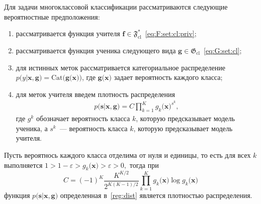 Для задачи многоклассовой классификации рассматриваются следующие вероятностные предположения:
\begin{enumerate}
\label{st:class:1}
	\item рассматривается функция учителя $\mathbf{f}\in\mathfrak{F}_{\text{cl}}^{*}$~\eqref{eq:F:set:cl:priv};
	\item рассматривается функция ученика следующего вида $\mathbf{g}\in\mathfrak{G}_{\text{cl}}$~\eqref{eq:G:set:cl};
	\item для истинных меток рассматривается категориальное распределение $p\bigr(y|\mathbf{x}, \mathbf{g}\bigr) = \text{Cat}\bigr(\mathbf{g}\bigr(\mathbf{x}\bigr)\bigr)$, где $\mathbf{g}\bigr(\mathbf{x}\bigr)$ задает вероятность каждого класса;
	\item для меток учителя введем плотность распределения
\[
\label{reg:dist}
\begin{aligned}
	p\bigr(\mathbf{s}|\mathbf{x}, \mathbf{g}\bigr) = C\prod_{k=1}^{K}g_k\bigr(\mathbf{x}\bigr)^{s^k},
\end{aligned}
\]
где $g^k$ обозначает вероятность класса $k$, которую предсказывает модель ученика, а $s^k$~--- вероятность класса $k$, которую предсказывает модель учителя.
\end{enumerate}
\begin{theorem}
\label{theorem:st:dist}
Пусть вероятнось каждого класса отделима от нуля и единицы, то есть для всех $k$ выполняется $1 > 1- \varepsilon > g_k\bigr(\mathbf{x}\bigr) > \varepsilon > 0,$ тогда при
\[
C=\left(-1\right)^{K}\frac{K^{K/2}}{2^{K(K-1)/2}}\prod_{k=1}^{K}g_k\bigr(\mathbf{x}\bigr)\log g_k\bigr(\mathbf{x}\bigr)
\]
функция $p\bigr(\mathbf{s}|\mathbf{x}, \mathbf{g}\bigr)$ определенная в~\eqref{reg:dist} является плотностью распределения.
\end{theorem}
